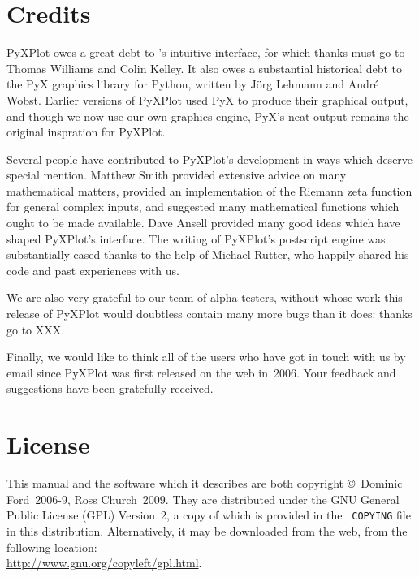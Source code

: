 \section{Credits}

PyXPlot owes a great debt to \gnuplot's intuitive interface, for which thanks
must go to Thomas Williams and Colin Kelley.  It also owes a substantial
historical debt to the PyX graphics library for Python, written by
J\"org Lehmann and Andr\'e Wobst.  Earlier versions of PyXPlot used PyX to
produce their graphical output, and though we now use our own graphics engine,
PyX's neat output remains the original inspration for PyXPlot.

Several people have contributed to PyXPlot's development in ways which deserve
special mention.  Matthew Smith provided extensive advice on many mathematical
matters, provided an implementation of the Riemann zeta function for general
complex inputs, and suggested many mathematical functions which ought to be
made available. Dave Ansell provided many good ideas which have shaped
PyXPlot's interface. The writing of PyXPlot's postscript engine was
substantially eased thanks to the help of Michael Rutter, who happily shared
his code and past experiences with us.

We are also very grateful to our team of alpha testers, without whose work this
release of PyXPlot would doubtless contain many more bugs than it does: thanks
go to XXX.

Finally, we would like to think all of the users who have got in touch with us
by email since PyXPlot was first released on the web in~2006. Your feedback and
suggestions have been gratefully received.

\section{License}

This manual and the software which it describes are both copyright \copyright\
Dominic Ford~2006-9, Ross Church~2009. They are distributed under the GNU
General Public License (GPL) Version~2, a copy of which is provided in the {\tt
COPYING} file in this distribution. Alternatively, it may be downloaded from the web, from
the following location:\\ \url{http://www.gnu.org/copyleft/gpl.html}.

